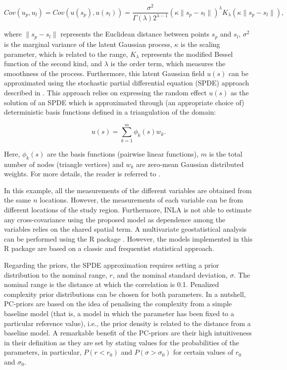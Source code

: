 $$
Cov(u_p, u_l) = Cov(u(s_p), u(s_l))= \frac{\sigma^2}{\Gamma(\lambda)2^{\lambda-1}} (\kappa \|s_p - s_l\|)^{\lambda}K_{\lambda}(\kappa \|s_p - s_l\|) ,
$$

\noindent
where $\|s_p - s_l\|$ represents the Euclidean distance between points $s_p$ and $s_l$, $\sigma^2$ is the marginal variance of the latent Gaussian process, $\kappa$ is the scaling parameter, which is related to the range, $K_{\lambda}$ represents the modified Bessel function of the second kind, and $\lambda$ is the order term, which measures the smoothness of the process. Furthermore, this latent Gaussian field $u(s)$ can be approximated using the stochastic partial differential equation (SPDE) approach described in \citet{SPDE}. This approach relies on expressing the random effect $u(s)$  as the solution of an SPDE which is approximated through (an appropriate choice of) deterministic basis functions defined in a triangulation of the domain:

$$
u(s) =\sum_{k=1}^{m} \phi_k(s) w_k .
$$

\noindent
Here, $\phi_k(s)$ are the basis functions (pairwise linear functions), $m$ is the total number of nodes (triangle vertices) and $w_k$ are zero-mean Gaussian distributed weights. For more details, the reader is referred to \citet{SPDE}.

\medskip
In this example, all the measurements of the different variables are obtained from the same $n$ locations. However, the measurements of each variable can be from  different locations of the study region. Furthermore, INLA is not able to estimate any cross-covariance using the proposed model as dependence among the variables relies on the shared spatial term. A multivariate geostatistical analysis can be performed using the R package . However, the models implemented in this R package are based on a classic and frequentist  statistical approach.
 


\medskip
Regarding the priors, the SPDE approximation requires setting a prior distribution to the nominal range, $r$, and the nominal standard deviation, $\sigma$. The nominal range is the distance at which the correlation is 0.1. Penalized complexity prior distributions \citep[PC-priors, ][]{PCpriors} can be chosen for both parameters. In a nutshell, PC-priors are based on the idea of penalising the complexity from a simple baseline model (that is, a model in which the parameter has been fixed to a particular reference value), i.e., the prior density is related to the distance from a baseline model. A remarkable benefit of the PC-priors are their high intuitiveness in their definition as they are set by stating values for the probabilities of the parameters, in particular, $P(r < r_0)$ and $P(\sigma > \sigma_0)$ for certain values of $r_0$ and $\sigma_0$.

